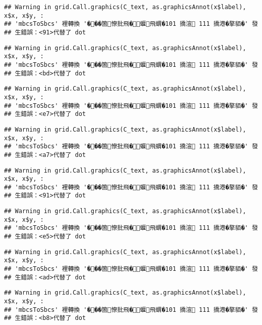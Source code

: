 \documentclass[
]{article}
\begin{document}
\begin{verbatim}
## Warning in grid.Call.graphics(C_text, as.graphicsAnnot(x$label), x$x, x$y, :
## 'mbcsToSbcs' 裡轉換 '���箇憭批飛�蝘飛蝟�101 撟渲 111 撟港�摮貊�' 發
## 生錯誤：<91>代替了 dot
\end{verbatim}

\begin{verbatim}
## Warning in grid.Call.graphics(C_text, as.graphicsAnnot(x$label), x$x, x$y, :
## 'mbcsToSbcs' 裡轉換 '���箇憭批飛�蝘飛蝟�101 撟渲 111 撟港�摮貊�' 發
## 生錯誤：<bd>代替了 dot
\end{verbatim}

\begin{verbatim}
## Warning in grid.Call.graphics(C_text, as.graphicsAnnot(x$label), x$x, x$y, :
## 'mbcsToSbcs' 裡轉換 '���箇憭批飛�蝘飛蝟�101 撟渲 111 撟港�摮貊�' 發
## 生錯誤：<e7>代替了 dot
\end{verbatim}

\begin{verbatim}
## Warning in grid.Call.graphics(C_text, as.graphicsAnnot(x$label), x$x, x$y, :
## 'mbcsToSbcs' 裡轉換 '���箇憭批飛�蝘飛蝟�101 撟渲 111 撟港�摮貊�' 發
## 生錯誤：<a7>代替了 dot
\end{verbatim}

\begin{verbatim}
## Warning in grid.Call.graphics(C_text, as.graphicsAnnot(x$label), x$x, x$y, :
## 'mbcsToSbcs' 裡轉換 '���箇憭批飛�蝘飛蝟�101 撟渲 111 撟港�摮貊�' 發
## 生錯誤：<91>代替了 dot
\end{verbatim}

\begin{verbatim}
## Warning in grid.Call.graphics(C_text, as.graphicsAnnot(x$label), x$x, x$y, :
## 'mbcsToSbcs' 裡轉換 '���箇憭批飛�蝘飛蝟�101 撟渲 111 撟港�摮貊�' 發
## 生錯誤：<e5>代替了 dot
\end{verbatim}

\begin{verbatim}
## Warning in grid.Call.graphics(C_text, as.graphicsAnnot(x$label), x$x, x$y, :
## 'mbcsToSbcs' 裡轉換 '���箇憭批飛�蝘飛蝟�101 撟渲 111 撟港�摮貊�' 發
## 生錯誤：<ad>代替了 dot
\end{verbatim}

\begin{verbatim}
## Warning in grid.Call.graphics(C_text, as.graphicsAnnot(x$label), x$x, x$y, :
## 'mbcsToSbcs' 裡轉換 '���箇憭批飛�蝘飛蝟�101 撟渲 111 撟港�摮貊�' 發
## 生錯誤：<b8>代替了 dot
\end{verbatim}
\end{document}
